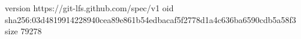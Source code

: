 version https://git-lfs.github.com/spec/v1
oid sha256:03d4819914228940cea89e861b54edbacaf5f2778d1a4c636ba6590cdb5a58f3
size 79278
